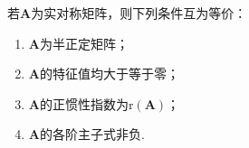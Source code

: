 \begin{theorem}
    若$\boldsymbol{A}$为实对称矩阵，则下列条件互为等价：
    \begin{enumerate}[(1)]
        \item $\boldsymbol{A}$为半正定矩阵；
        \item $\boldsymbol{A}$的特征值均大于等于零；
        \item $\boldsymbol{A}$的正惯性指数为$\mathrm{r}(\boldsymbol{A})$；
        \item $\boldsymbol{A}$的各阶主子式非负.
    \end{enumerate}
\end{theorem}

